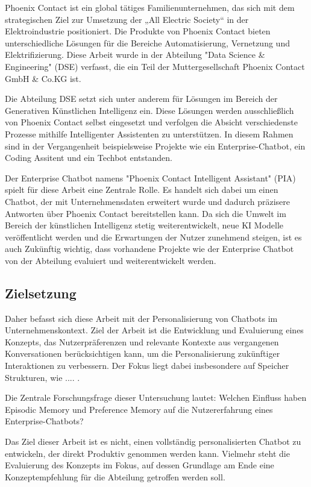 Phoenix Contact ist ein global tätiges Familienunternehmen, das sich mit dem strategischen Ziel zur Umsetzung der „All Electric Society“ in der Elektroindustrie positioniert. Die Produkte von Phoenix Contact bieten unterschiedliche Lösungen für die Bereiche Automatisierung, Vernetzung und Elektrifizierung. Diese Arbeit wurde in der Abteilung "Data Science \& Engineering" (DSE) verfasst, die ein Teil der Muttergesellschaft Phoenix Contact GmbH \& Co.KG ist.

Die Abteilung DSE setzt sich unter anderem für Lösungen im Bereich der Generativen Künstlichen Intelligenz ein. Diese Lösungen werden ausschließlich von Phoenix Contact selbst eingesetzt und verfolgen die Absicht verschiedenste Prozesse mithilfe Intelligenter Assistenten zu unterstützen. In diesem Rahmen sind in der Vergangenheit beispielsweise Projekte wie ein Enterprise-Chatbot, ein Coding Assitent und ein Techbot entstanden.

Der Enterprise Chatbot namens "Phoenix Contact Intelligent Assistant" (PIA) spielt für diese Arbeit eine Zentrale Rolle. Es handelt sich dabei um einen Chatbot, der mit Unternehmensdaten erweitert wurde und dadurch präzisere Antworten über Phoenix Contact bereitstellen kann. Da sich die Umwelt im Bereich der künstlichen Intelligenz stetig weiterentwickelt, neue KI Modelle veröffentlicht werden und die Erwartungen der Nutzer zunehmend steigen, ist es auch Zukünftig wichtig, dass vorhandene Projekte wie der Enterprise Chatbot von der Abteilung evaluiert und weiterentwickelt werden.


\subsection{Zielsetzung}

Daher befasst sich diese Arbeit mit der Personalisierung von Chatbots im Unternehmenskontext. Ziel der Arbeit ist die Entwicklung und Evaluierung eines Konzepts, das Nutzerpräferenzen und relevante Kontexte aus vergangenen Konversationen berücksichtigen kann, um die Personalisierung zukünftiger Interaktionen zu verbessern. Der Fokus liegt dabei insbesondere auf Speicher Strukturen, wie .... . 

Die Zentrale Forschungsfrage dieser Untersuchung lautet: Welchen Einfluss haben Episodic Memory und Preference Memory auf die Nutzererfahrung eines Enterprise-Chatbots?

Das Ziel dieser Arbeit ist es nicht, einen vollständig personalisierten Chatbot zu entwickeln, der direkt Produktiv genommen werden kann. Vielmehr steht die Evaluierung des Konzepts im Fokus, auf dessen Grundlage am Ende eine Konzeptempfehlung für die Abteilung getroffen werden soll.
